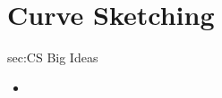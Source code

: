 \chapter{Curve Sketching}
\label{chap:CS}

\begin{bigideas}{sec:CS Big Ideas}
\begin{itemize}
  \item 
\end{itemize}
\end{bigideas}